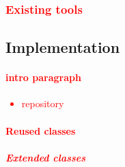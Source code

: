 \documentclass[12pt,a4,xcolor=table]{article}
\begin{document}
	\textcolor{red}{
		\subsubsection{Existing tools}
	}
	
	\subsection{Implementation}
	\textcolor{red}{
	\paragraph{intro paragraph}	
	\begin{itemize}
		\item repository
	\end{itemize}
	\paragraph{Reused classes}
	\subparagraph{Extended classes}
}
\end{document}

